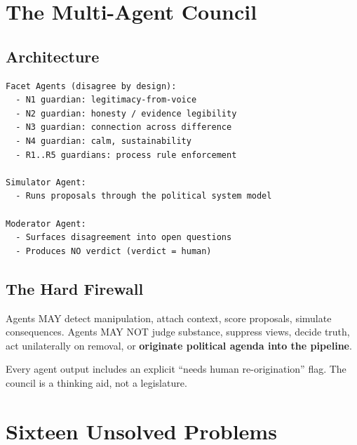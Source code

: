 \documentclass[11pt,a4paper]{article}
\begin{document}
\section{The Multi-Agent Council}\label{sec:council}

\subsection{Architecture}

\begin{verbatim}
Facet Agents (disagree by design):
  - N1 guardian: legitimacy-from-voice
  - N2 guardian: honesty / evidence legibility
  - N3 guardian: connection across difference
  - N4 guardian: calm, sustainability
  - R1..R5 guardians: process rule enforcement

Simulator Agent:
  - Runs proposals through the political system model

Moderator Agent:
  - Surfaces disagreement into open questions
  - Produces NO verdict (verdict = human)
\end{verbatim}

\subsection{The Hard Firewall}

Agents MAY detect manipulation, attach context, score proposals, simulate
consequences. Agents MAY NOT judge substance, suppress views, decide truth, act
unilaterally on removal, or \textbf{originate political agenda into the pipeline}.

Every agent output includes an explicit ``needs human re-origination'' flag.
The council is a thinking aid, not a legislature.

\section{Sixteen Unsolved Problems}
\end{document}
